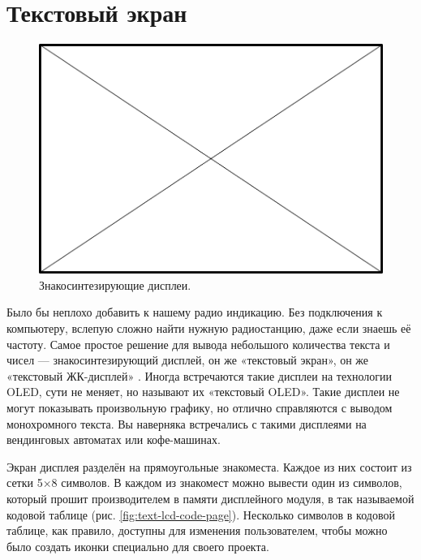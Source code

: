 \section{Текстовый экран}

\begin{figure}
  \centering
  \includegraphics{TODO}
  \caption{Знакосинтезирующие дисплеи.}
\end{figure}

Было бы неплохо добавить к нашему радио индикацию. Без подключения к компьютеру, вслепую сложно найти нужную радиостанцию, даже если знаешь её частоту. Самое простое решение для вывода небольшого количества текста и чисел — знакосинтезирующий дисплей, он же «текстовый экран», он же «текстовый ЖК-дисплей» . Иногда встречаются такие дисплеи на технологии OLED, сути не меняет, но называют их «текстовый OLED». Такие дисплеи не могут показывать произвольную графику, но отлично справляются с выводом монохромного текста. Вы наверняка встречались с такими дисплеями на вендинговых автоматах или кофе-машинах.

Экран дисплея разделён на прямоугольные знакоместа. Каждое из них состоит из сетки 5×8 символов. В каждом из знакомест можно вывести один из символов, который прошит производителем в памяти дисплейного модуля, в так называемой кодовой таблице (рис. \ref{fig:text-lcd-code-page}). Несколько символов в кодовой таблице, как правило, доступны для изменения пользователем, чтобы можно было создать иконки специально для своего проекта.


